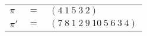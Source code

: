 \begin{example}\label{example:QJCKPQSS}
  \hfill
  \begin{\position}
    \begin{tabular}{lll}
      $\pi$  & $=$ & $(4~1~5~3~2)$ \\
      $\pi'$ & $=$ & $(7~8~1~2~9~10~5~6~3~4)$ \\
    \end{tabular}
  \end{\position}
\end{example}